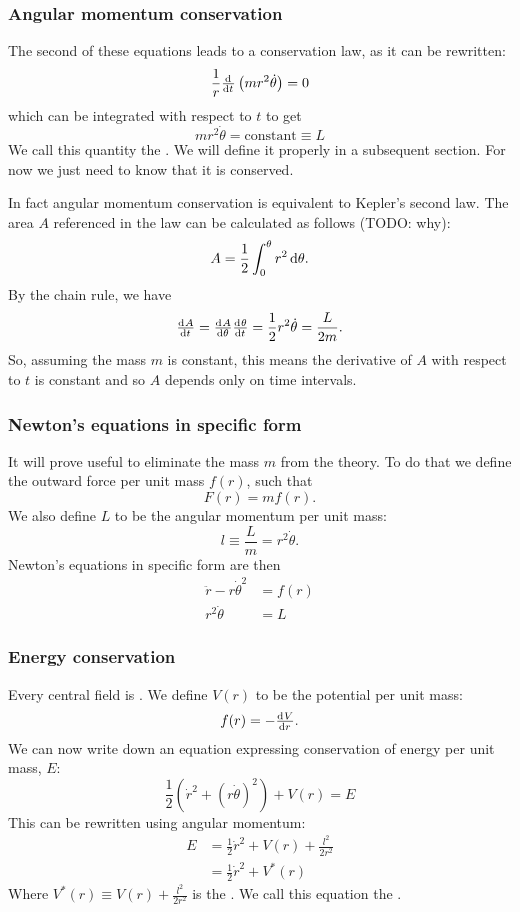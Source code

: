 \subsubsection{Angular momentum conservation}
The second of these equations leads to a conservation law, as it can be rewritten:
\[ \frac{1}{r}\od{}{t}\left(mr^2 \dot{\theta}\right) = 0 \]
which can be integrated with respect to $t$ to get
\[ mr^2 \dot{\theta} = \text{constant} \equiv L \]
We call this quantity the . We will define it properly in a subsequent section. For now we just need to know that it is conserved.

In fact angular momentum conservation is equivalent to Kepler's second law. The area $A$ referenced in the law can be calculated as follows (TODO: why):
\[ A = \frac{1}{2}\int_0^{\theta} r^2 \operatorname{d \!}{\theta}. \]
By the chain rule, we have
\[ \od{A}{t} = \od{A}{\theta}\od{\theta}{t} = \frac{1}{2}r^2 \dot{\theta} = \frac{L}{2m}. \]
So, assuming the mass $m$ is constant, this means the derivative of $A$ with respect to $t$ is constant and so $A$ depends only on time intervals.

\subsubsection{Newton's equations in specific form}
It will prove useful to eliminate the mass $m$ from the theory. To do that we define the outward force per unit mass $f(r)$, such that
\[ F(r) = mf(r). \]
We also define $L$ to be the angular momentum per unit mass:
\[ l \equiv \frac{L}{m} = r^2 \dot{\theta}. \]
Newton's equations in specific form are then 
\begin{align*}
\ddot{r} - r \dot{\theta}^2 &= f(r) \\
r^2 \dot{\theta} &= L
\end{align*}

\subsubsection{Energy conservation}
Every central field is . We define $V(r)$ to be the potential per unit mass:
\[ f(r) = - \od{V}{r}. \]
We can now write down an equation expressing conservation of energy per unit mass, $E$:
\[ \frac{1}{2}\left(\dot{r}^2 + (r \dot{\theta})^2\right) + V(r) = E \]
This can be rewritten using angular momentum:
\begin{align*}
E &= \frac{1}{2}\dot{r}^2 + V(r) + \frac{l^2}{2r^2} \\
&= \frac{1}{2}\dot{r}^2 + V^*(r)
\end{align*}
Where $V^*(r) \equiv V(r) + \frac{l^2}{2r^2}$ is the . We call this equation the .

